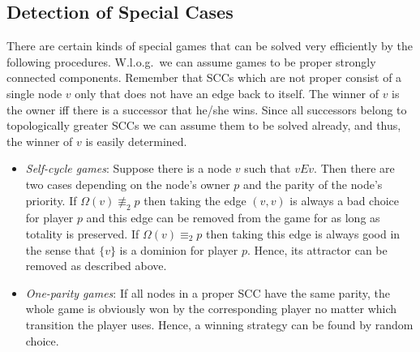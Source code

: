 \subsection{Detection of Special Cases}

There are certain kinds of special games that can be solved very efficiently by the following procedures. 
W.l.o.g.\ we can assume games to be proper strongly connected components. Remember that SCCs which are not proper
consist of a single node $v$ only that does not have an edge back to itself. The winner of $v$ is the owner
iff there is a successor that he/she wins. Since all successors belong to topologically greater SCCs we can
assume them to be solved already, and thus, the winner of $v$ is easily determined.

\begin{itemize}
\item \emph{Self-cycle games}: Suppose there is a node $v$ such that $vEv$. Then there are two cases depending on
the node's owner $p$ and the parity of the node's priority. If $\Omega(v) \not\equiv_2 p$ then taking the edge 
$(v,v)$ is always a bad choice for player $p$ and this edge can be removed from the game for as long as 
totality is preserved. If $\Omega(v) \equiv_2 p$ then taking this edge is always good in the sense that 
$\{v\}$ is a dominion for player $p$. Hence, its attractor can be removed as described above.

\item \emph{One-parity games}: If all nodes in a proper SCC have the same parity, the whole game is obviously won 
by the corresponding player no matter which transition the player uses. Hence, a winning strategy can be found 
by random choice.


\end{itemize}
